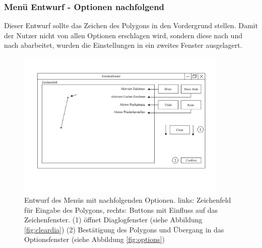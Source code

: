\subsubsection{Menü Entwurf - Optionen nachfolgend}
\raggedbottom
Dieser Entwurf sollte das Zeichen des Polygons in den Vordergrund stellen. Damit der Nutzer nicht von allen Optionen erschlagen wird, sondern diese nach und nach abarbeitet, wurden die Einstellungen in ein zweites Fenster 
ausgelagert. \pagebreak

\begin{figure}[t]
    \includegraphics[width=0.9\textwidth]{bilder/menu_ohne_optionen.png}
    \caption[Entwurf des Menüs mit nachfolgenden Optionen]{Entwurf des Menüs mit nachfolgenden Optionen. links: Zeichenfeld für Eingabe des Polygons, rechts: Buttons mit Einfluss auf das Zeichenfenster. (1) öffnet Diaglogfenster (siehe Abbildung \ref{fig:cleardia})
    (2) Bestätigung des Polygons und Übergang in das Optionsfenster (siehe Abbildung \ref{fig:options})}
    \label{fig:menu_ohne_optionenen}
\end{figure}

